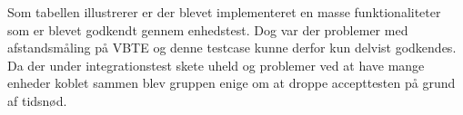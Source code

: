 Som tabellen illustrerer er der blevet implementeret en masse funktionaliteter som er blevet godkendt gennem enhedstest. Dog var der problemer med afstandsmåling på VBTE og denne testcase kunne derfor kun delvist godkendes.\\
Da der under integrationstest skete uheld og problemer ved at have mange enheder koblet sammen blev gruppen enige om at droppe accepttesten på grund af tidsnød.\\